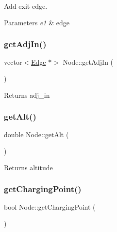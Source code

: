 Add exit edge. 


\begin{DoxyParams}{Parameters}
{\em e1} & edge \\
\hline
\end{DoxyParams}
\mbox{\label{class_node_a3f01ccf70c3cf5b1df6fc0c560bfe5ef}} 
\subsubsection{\texorpdfstring{get\+Adj\+In()}{getAdjIn()}}
{\footnotesize\ttfamily vector$<$\mbox{\hyperlink{class_edge}{Edge}} $\ast$$>$ Node\+::get\+Adj\+In (\begin{DoxyParamCaption}{ }\end{DoxyParamCaption})\hspace{0.3cm}{\ttfamily [inline]}}

\begin{DoxyReturn}{Returns}
adj\+\_\+in 
\end{DoxyReturn}
\mbox{\label{class_node_ad772b7e55055f1d8d3ae2a7d99b63d72}} 
\subsubsection{\texorpdfstring{get\+Alt()}{getAlt()}}
{\footnotesize\ttfamily double Node\+::get\+Alt (\begin{DoxyParamCaption}{ }\end{DoxyParamCaption})\hspace{0.3cm}{\ttfamily [inline]}}

\begin{DoxyReturn}{Returns}
altitude 
\end{DoxyReturn}
\mbox{\label{class_node_ae207a54fd98dc3ad4369f85530de4529}} 
\subsubsection{\texorpdfstring{get\+Charging\+Point()}{getChargingPoint()}}
{\footnotesize\ttfamily bool Node\+::get\+Charging\+Point (\begin{DoxyParamCaption}{ }\end{DoxyParamCaption})\hspace{0.3cm}{\ttfamily [inline]}}

